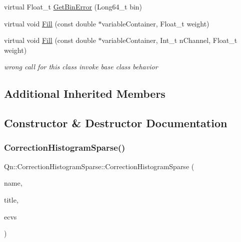\begin{DoxyCompactItemize}
\item 
virtual Float\+\_\+t \mbox{\hyperlink{classQn_1_1CorrectionHistogramSparse_a9b678b088ca0b21e6deb18d66ac44c2d}{Get\+Bin\+Error}} (Long64\+\_\+t bin)
\item 
virtual void \mbox{\hyperlink{classQn_1_1CorrectionHistogramSparse_a0bb5a6f7772532ed7a174cc688cf5b92}{Fill}} (const double $\ast$variable\+Container, Float\+\_\+t weight)
\item 
\mbox{\label{classQn_1_1CorrectionHistogramSparse_ac6669127f178e1a7c7cbf149576371bd}} 
virtual void \mbox{\hyperlink{classQn_1_1CorrectionHistogramSparse_ac6669127f178e1a7c7cbf149576371bd}{Fill}} (const double $\ast$variable\+Container, Int\+\_\+t n\+Channel, Float\+\_\+t weight)
\begin{DoxyCompactList}\small\item\em wrong call for this class invoke base class behavior \end{DoxyCompactList}\end{DoxyCompactItemize}
\subsection*{Additional Inherited Members}


\subsection{Constructor \& Destructor Documentation}
\mbox{\label{classQn_1_1CorrectionHistogramSparse_a0399954f4572a32e62d70a7ea0fc7e17}} 
\subsubsection{\texorpdfstring{Correction\+Histogram\+Sparse()}{CorrectionHistogramSparse()}}
{\footnotesize\ttfamily Qn\+::\+Correction\+Histogram\+Sparse\+::\+Correction\+Histogram\+Sparse (\begin{DoxyParamCaption}\item[{const char $\ast$}]{name,  }\item[{const char $\ast$}]{title,  }\item[{\mbox{\hyperlink{classQn_1_1EventClassVariablesSet}{Event\+Class\+Variables\+Set}} \&}]{ecvs }\end{DoxyParamCaption})}

